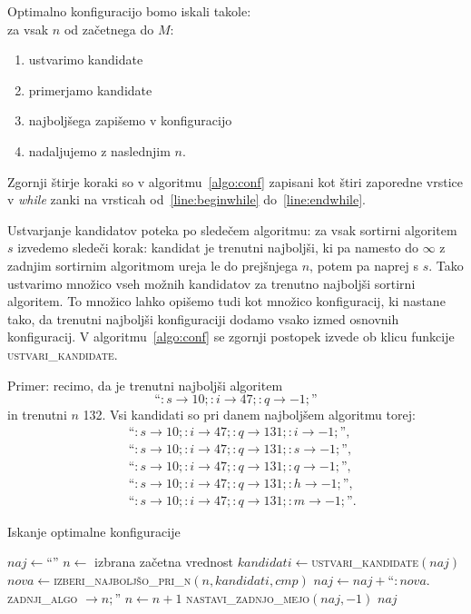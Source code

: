 \documentclass[a4paper,oneside,12pt]{article}
\newcommand{\lra}{\ensuremath{\longrightarrow}}
\begin{document}
Optimalno konfiguracijo bomo iskali takole: \\
za vsak $n$ od začetnega do $M$:
\begin{enumerate}[1.)]
  \item ustvarimo kandidate
  \item primerjamo kandidate
  \item najboljšega zapišemo v konfiguracijo
  \item nadaljujemo z naslednjim $n$.
\end{enumerate}

Zgornji štirje koraki so v algoritmu~\ref{algo:conf} zapisani kot štiri zaporedne vrstice v
\emph{while} zanki na vrsticah od~\ref{line:beginwhile} do~\ref{line:endwhile}.

Ustvarjanje kandidatov poteka po sledečem algoritmu: za vsak sortirni algoritem $s$
izvedemo sledeči korak:
kandidat je trenutni najboljši, ki pa namesto do $\infty$ z zadnjim sortirnim
algoritmom ureja le do prejšnjega $n$, potem pa naprej s $s$. Tako ustvarimo množico
vseh možnih kandidatov za trenutno najboljši sortirni algoritem.
To množico lahko opišemo tudi kot množico konfiguracij, ki nastane tako, da trenutni
najboljši konfiguraciji dodamo vsako izmed osnovnih konfiguracij.
V algoritmu~\ref{algo:conf} se
zgornji postopek izvede ob klicu funkcije \textsc{ustvari\_kandidate}.

Primer: recimo, da je trenutni najboljši algoritem 
\[ \mbox{``$:s \lra 10;:i \lra 47;:q \lra -1;$''} \] in trenutni $n$ 132.
Vsi kandidati so pri danem najboljšem algoritmu torej:
\begin{align*}
   \ & \mbox{``$:s \lra 10;:i \lra 47;:q \lra 131;:i \lra -1;$''}, \\ 
   \ & \mbox{``$:s \lra 10;:i \lra 47;:q \lra 131;:s \lra -1;$''}, \\
   \ & \mbox{``$:s \lra 10;:i \lra 47;:q \lra 131;:q \lra -1;$''}, \\
   \ & \mbox{``$:s \lra 10;:i \lra 47;:q \lra 131;:h \lra -1;$''}, \\
   \ & \mbox{``$:s \lra 10;:i \lra 47;:q \lra 131;:m \lra -1;$''}. 
\end{align*}

\begin{algorithm}[h!t!]
  \caption{Iskanje optimalne konfiguracije}\label{algo:conf}
  \begin{algorithmic}[1]
    \State \label{line:confinit}$naj \gets $``''
    \State $n \gets $ izbrana začetna vrednost
     \label{line:beginwhile}
        \State \label{line:kanddati} $kandidati \gets $\textsc{ustvari\_kandidate}$(naj)$
        \State \label{line:bestatn} $nova \gets $\textsc{izberi\_najboljšo\_pri\_n}$(n, kandidati, cmp)$
        \State \label{line:addconf} $naj \gets naj + $``$:nova.$\textsc{zadnji\_algo} $\lra n;$''
        \State \label{line:n++} $n \gets n + 1$
    \EndWhile \label{line:endwhile}
    \State \textsc{nastavi\_zadnjo\_mejo}$(naj, -1)$
    \State \Return $naj$
  \end{algorithmic}
\end{algorithm}
\end{document}
